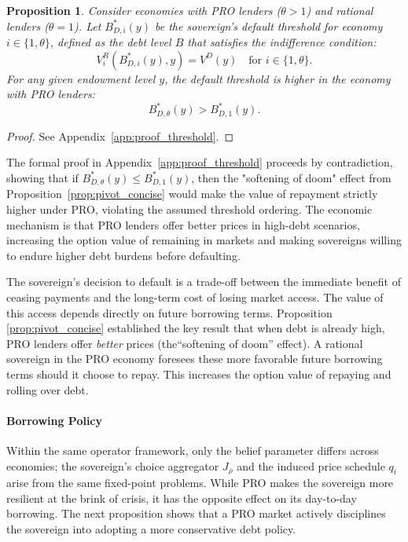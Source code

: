 \documentclass[12pt]{article}
\theoremstyle{plain}
\newtheorem{proposition}{Proposition}
\begin{document}
\begin{proposition}
	\label{prop:threshold}
	Consider economies with PRO lenders ($\theta > 1$) and rational lenders ($\theta = 1$). Let $B^*_{D,i}(y)$ be the sovereign's default threshold for economy $i \in \{1, \theta\}$, defined as the debt level $B$ that satisfies the indifference condition:
	\begin{equation}
		V^R_i(B^*_{D,i}(y),y) = V^D(y) \quad \text{for } i \in \{1, \theta\}.
		\label{eq:default_threshold_definition}
	\end{equation}
	For any given endowment level $y$, the default threshold is higher in the economy with PRO lenders:
	\begin{equation*}
		B^*_{D,\theta}(y) > B^*_{D,1}(y).
	\end{equation*}
\end{proposition}

\begin{proof}
	See Appendix~\ref{app:proof_threshold}.
\end{proof}
The formal proof in Appendix~\ref{app:proof_threshold} proceeds by contradiction, showing that if $B^*_{D,\theta}(y) \leq B^*_{D,1}(y)$, then the "softening of doom" effect from Proposition~\ref{prop:pivot_concise} would make the value of repayment strictly higher under PRO, violating the assumed threshold ordering. The economic mechanism is that PRO lenders offer better prices in high-debt scenarios, increasing the option value of remaining in markets and making sovereigns willing to endure higher debt burdens before defaulting.

The sovereign's decision to default is a trade-off between the immediate
benefit of ceasing payments and the long-term cost of losing market access. The
value of this access depends directly on future borrowing terms. Proposition
\ref{prop:pivot_concise} established the key result that when debt is already
high, PRO lenders offer \textit{better} prices (the``softening of doom''
effect). A rational sovereign in the PRO economy foresees these more favorable
future borrowing terms should it choose to repay. This increases the option
value of repaying and rolling over debt.

\paragraph{Borrowing Policy}
Within the same operator framework, only the belief parameter differs across
economies; the sovereign's choice aggregator $J_\rho$ and the induced price
schedule $q_i$ arise from the same fixed-point problems. While PRO makes the
sovereign more resilient at the brink of crisis, it has the opposite effect on
its day-to-day borrowing. The next proposition shows that a PRO market actively
disciplines the sovereign into adopting a more conservative debt policy.
\end{document}
